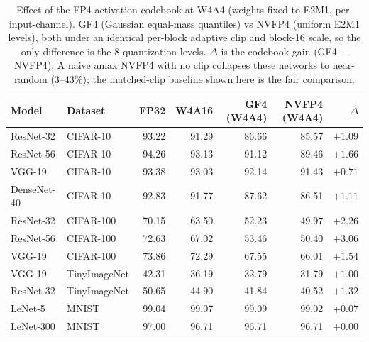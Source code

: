 \begin{table}[t]
  \centering
  \small
  \caption{Effect of the FP4 activation codebook at W4A4 (weights fixed to E2M1,
    per-input-channel). GF4 (Gaussian equal-mass quantiles) vs NVFP4 (uniform E2M1
    levels), both under an identical per-block adaptive clip and block-16 scale, so
    the only difference is the 8 quantization levels. $\Delta$ is the codebook gain
    (GF4 $-$ NVFP4). A naive amax NVFP4 with no clip collapses these networks to
    near-random ($3$--$43\%$); the matched-clip baseline shown here is the fair
    comparison.}
  \label{tab:gf4-vs-nvfp4}
  \begin{tabular}{llrrrrr}
    \toprule
    Model & Dataset & FP32 & W4A16 & GF4 (W4A4) & NVFP4 (W4A4) & $\Delta$ \\
    \midrule
    ResNet-32   & CIFAR-10  & 93.22 & 91.29 & 86.66 & 85.57 & $+1.09$ \\
    ResNet-56   & CIFAR-10  & 94.26 & 93.13 & 91.12 & 89.46 & $+1.66$ \\
    VGG-19      & CIFAR-10  & 93.38 & 93.03 & 92.14 & 91.43 & $+0.71$ \\
    DenseNet-40 & CIFAR-10  & 92.83 & 91.77 & 87.62 & 86.51 & $+1.11$ \\
    \midrule
    ResNet-32   & CIFAR-100 & 70.15 & 63.50 & 52.23 & 49.97 & $+2.26$ \\
    ResNet-56   & CIFAR-100 & 72.63 & 67.02 & 53.46 & 50.40 & $+3.06$ \\
    VGG-19      & CIFAR-100 & 73.86 & 72.29 & 67.55 & 66.01 & $+1.54$ \\
    \midrule
    VGG-19      & TinyImageNet & 42.31 & 36.19 & 32.79 & 31.79 & $+1.00$ \\
    ResNet-32   & TinyImageNet & 50.65 & 44.90 & 41.84 & 40.52 & $+1.32$ \\
    \midrule
    LeNet-5     & MNIST     & 99.04 & 99.07 & 99.09 & 99.02 & $+0.07$ \\
    LeNet-300   & MNIST     & 97.00 & 96.71 & 96.71 & 96.71 & $+0.00$ \\
    \bottomrule
  \end{tabular}
\end{table}

